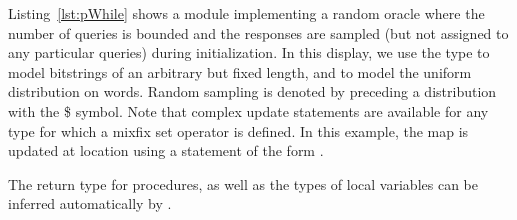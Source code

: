 Listing~\ref{lst:pWhile} shows a module implementing a random oracle where the
number of queries is bounded and the responses are sampled (but not assigned to
any particular queries) during initialization. In this display, we use the type
 to model bitstrings of an arbitrary but fixed length, and
 to model the uniform distribution on words. Random sampling is
denoted by preceding a distribution with the \textsf{\$} symbol. Note that
complex update statements are available for any type for which a mixfix set
operator is defined. In this example, the map  is updated at location
 using a statement of the form .


The return type for procedures, as well as the types of local variables can be
inferred automatically by \EasyCrypt.

